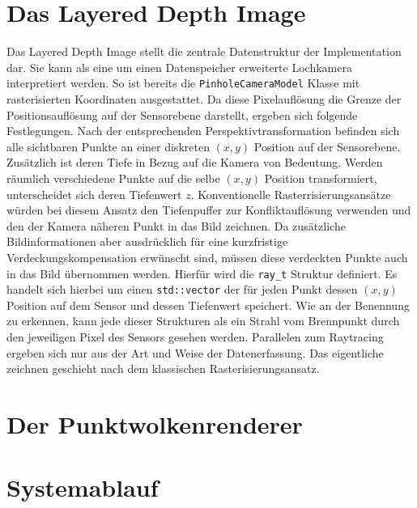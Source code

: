 \documentclass[hyperref, beleg, german]{cgvpub}
\begin{document}
\section{Das Layered Depth Image}

Das Layered Depth Image stellt die zentrale Datenstruktur der Implementation
dar. Sie kann als eine um einen Datenspeicher erweiterte Lochkamera
interpretiert werden. So ist bereits die \texttt{PinholeCameraModel} Klasse mit
rasterisierten Koordinaten ausgestattet. Da diese Pixelauflösung die Grenze der
Positionsauflösung auf der Sensorebene darstellt, ergeben sich folgende
Festlegungen. Nach der entsprechenden Perspektivtransformation befinden sich
alle sichtbaren Punkte an einer diskreten \( (x, y) \) Position auf der
Sensorebene. Zusätzlich ist deren Tiefe in Bezug auf die Kamera von Bedeutung.
Werden räumlich verschiedene Punkte auf die selbe \( (x,y) \) Position
transformiert, unterscheidet sich deren Tiefenwert \(z\). Konventionelle
Rasterrisierungsansätze würden bei diesem Ansatz den Tiefenpuffer zur
Konfliktauflösung verwenden und den der Kamera näheren Punkt in das Bild
zeichnen. Da zusätzliche Bildinformationen aber ausdrücklich für eine
kurzfristige Verdeckungskompensation erwünscht sind, müssen diese verdeckten
Punkte auch in das Bild übernommen werden. Hierfür wird die \texttt{ray\_t}
Struktur definiert. Es handelt sich hierbei um einen \texttt{std::vector} der
für jeden Punkt dessen \( (x,y) \) Position auf dem Sensor und dessen Tiefenwert
speichert. Wie an der Benennung zu erkennen, kann jede dieser Strukturen als ein
Strahl vom Brennpunkt durch den jeweiligen Pixel des Sensors gesehen werden.
Parallelen zum Raytracing ergeben sich nur aus der Art und Weise der
Datenerfassung. Das eigentliche zeichnen geschieht nach dem klassischen
Rasterisierungsansatz.

\section{Der Punktwolkenrenderer}

\section{Systemablauf}
\end{document}
